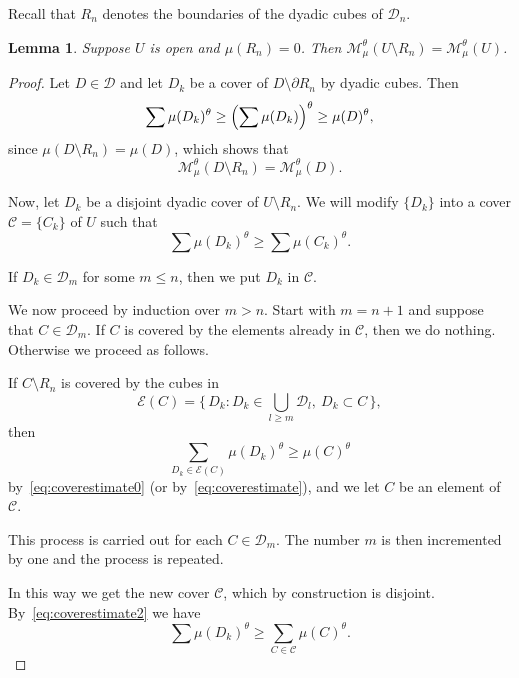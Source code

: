 \documentclass[10pt]{amsart}
\newtheorem{lemm}[theo]{Lemma}\newtheorem{prop}[theo]{Proposition}\newtheorem{coro}[theo]{Corollary}\newtheorem{conj}[theo]{Conjecture}
\theoremstyle{definition}\newtheorem{defi}[theo]{Definition}\newtheorem{rema}[theo]{Remark}\newtheorem{exam}[theo]{Example}\newtheorem{exem}[theo]{Example}\newtheorem{nota}[theo]{Notation}
\begin{document}
Recall that $R_n$ denotes the boundaries of the dyadic cubes of $\mathscr{D}_n$.

\begin{lemm}\label{lem:opensets}
Suppose $U$ is open and $\mu (R_n) = 0$. Then $\mathscr{M}_\mu^\theta (U \setminus R_n) = \mathscr{M}_\mu^\theta (U)$.
\end{lemm}

\begin{proof}
Let $D \in \mathscr{D}$ and let $D_k$ be a cover of $D \setminus
\partial R_n$ by dyadic cubes. Then
\begin{equation}\label{eq:coverestimate0}
\sum \mu (D_k)^\theta \geq \Bigl(\sum \mu(D_k) \Bigr)^\theta \geq
\mu (D)^\theta,
\end{equation}
since $\mu (D \setminus R_n) = \mu (D)$, which shows that
\begin{equation}\label{eq:coverestimate}
\mathscr{M}_\mu^\theta (D \setminus R_n) = \mathscr{M}_\mu^\theta (D).
\end{equation}

Now, let $D_k$ be a disjoint dyadic cover of $U \setminus R_n$. We will modify $\{D_k\}$ into a cover $\mathscr{C} = \{C_k\}$ of $U$ such that
\[
\sum \mu (D_k)^\theta \geq \sum \mu (C_k)^\theta.
\]

If $D_k \in \mathscr{D}_m$ for some $m \leq n$, then we put $D_k$ in $\mathscr{C}$.

We now proceed by induction over $m > n$. Start with $m = n +1$ and suppose that $C \in \mathscr{D}_m$. If $C$ is covered by the elements already in $\mathscr{C}$, then we do nothing. Otherwise we proceed as follows.

If $C \setminus R_n$ is covered by the cubes in
\[
\mathscr{E} (C) = \biggl\{\, D_k : D_k \in \bigcup_{l \geq m}
\mathscr{D}_l,\ D_k \subset C\, \biggr\},
\]
then
\begin{equation}\label{eq:coverestimate2}
\sum_{D_k \in \mathscr{E} (C)} \mu (D_k)^\theta \geq \mu (C)^\theta
\end{equation}
by~\eqref{eq:coverestimate0} (or by~\eqref{eq:coverestimate}), and we let $C$ be an element of $\mathscr{C}$.

This process is carried out for each $C \in \mathscr{D}_m$. The number $m$ is then incremented by one and the process is repeated.

In this way we get the new cover $\mathscr{C}$, which by construction is disjoint. By~\eqref{eq:coverestimate2} we have
\begin{equation}\label{eq:coverestimate3}
\sum \mu (D_k)^\theta \geq \sum_{C \in \mathscr{C}} \mu (C)^\theta.
\end{equation}


\end{proof}
\end{document}
